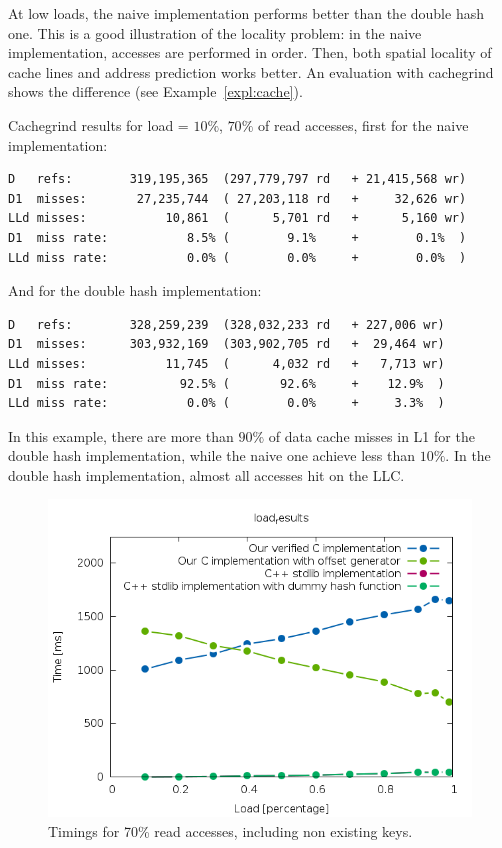 \documentclass[oneside]{article}
\begin{document}
At low loads, the naive implementation performs better than the double hash one. This is a good illustration of the locality problem: in the naive implementation, accesses are performed in order. Then, both spatial locality of cache lines and address prediction works better. An evaluation with cachegrind shows the difference (see Example~\ref{expl:cache}).
\begin{example}
	\label{expl:cache}
Cachegrind results for load = $10\%$, $70\%$ of read accesses, first for the naive implementation: 
	\begin{verbatim}
D   refs:        319,195,365  (297,779,797 rd   + 21,415,568 wr)
D1  misses:       27,235,744  ( 27,203,118 rd   +     32,626 wr)
LLd misses:           10,861  (      5,701 rd   +      5,160 wr)
D1  miss rate:           8.5% (        9.1%     +        0.1%  )
LLd miss rate:           0.0% (        0.0%     +        0.0%  )
	\end{verbatim}
And for the double hash implementation: 
	\begin{verbatim}
D   refs:        328,259,239  (328,032,233 rd   + 227,006 wr)
D1  misses:      303,932,169  (303,902,705 rd   +  29,464 wr)
LLd misses:           11,745  (      4,032 rd   +   7,713 wr)
D1  miss rate:          92.5% (       92.6%     +    12.9%  )
LLd miss rate:           0.0% (        0.0%     +     3.3%  )
	\end{verbatim}

In this example, there are more than $90\%$ of data cache misses in L1 for the double hash implementation, while the naive one achieve less than $10\%$. In the double hash implementation, almost all accesses hit on the LLC.
\end{example}

\begin{figure}[p]
	\centering
	\includegraphics[height=.4\textheight]{result_example_contains.png}
	\caption{Timings for 70\% read accesses, including non existing keys.}
	\label{fig:result_contains}
\end{figure}
\end{document}
